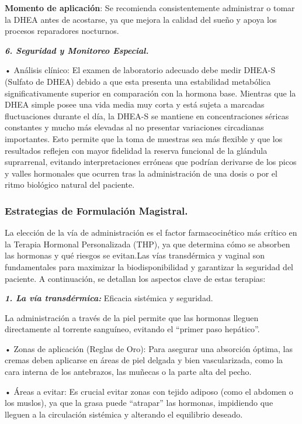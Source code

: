 \documentclass[
  spanish,
]{article}
\begin{document}
\textbf{Momento de aplicación}: Se recomienda consistentemente administrar o tomar la DHEA antes de acostarse, ya que mejora la calidad del sueño y apoya los procesos reparadores nocturnos.

\textbf{\emph{6. Seguridad y Monitoreo Especial.}}

• Análisis clínico: El examen de laboratorio adecuado debe medir DHEA-S (Sulfato de DHEA) debido a que esta presenta una estabilidad metabólica significativamente superior en comparación con la hormona base. Mientras que la DHEA simple posee una vida media muy corta y está sujeta a marcadas fluctuaciones durante el día, la DHEA-S se mantiene en concentraciones séricas constantes y mucho más elevadas al no presentar variaciones circadianas importantes. Esto permite que la toma de muestras sea más flexible y que los resultados reflejen con mayor fidelidad la reserva funcional de la glándula suprarrenal, evitando interpretaciones erróneas que podrían derivarse de los picos y valles hormonales que ocurren tras la administración de una dosis o por el ritmo biológico natural del paciente.

\subsubsection{Estrategias de Formulación Magistral.}\label{estrategias-de-formulaciuxf3n-magistral.}

La elección de la vía de administración es el factor farmacocinético más crítico en la Terapia Hormonal Personalizada (THP), ya que determina cómo se absorben las hormonas y qué riesgos se evitan.Las vías transdérmica y vaginal son fundamentales para maximizar la biodisponibilidad y garantizar la seguridad del paciente.
A continuación, se detallan los aspectos clave de estas terapias:

\textbf{\emph{1. La vía transdérmica:}} Eficacia sistémica y seguridad.

La administración a través de la piel permite que las hormonas lleguen directamente al torrente sanguíneo, evitando el ``primer paso hepático''.

• Zonas de aplicación (Reglas de Oro): Para asegurar una absorción óptima, las cremas deben aplicarse en áreas de piel delgada y bien vascularizada, como la cara interna de los antebrazos, las muñecas o la parte alta del pecho.

• Áreas a evitar: Es crucial evitar zonas con tejido adiposo (como el abdomen o los muslos), ya que la grasa puede ``atrapar'' las hormonas, impidiendo que lleguen a la circulación sistémica y alterando el equilibrio deseado.
\end{document}
